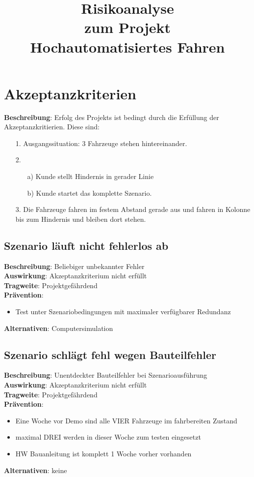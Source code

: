 \documentclass[a4paper, 12pt, titlepage]{scrartcl}
\begin{document}
\title{Risikoanalyse\\zum Projekt\\Hochautomatisiertes Fahren} 
\publishers{Humboldt-Universit\"at zu Berlin}
\maketitle
\tableofcontents
\newpage

\section{Akzeptanzkriterien}
\textbf{Beschreibung}: Erfolg des Projekts ist bedingt durch die Erfüllung der Akzeptanzkritierien. Diese sind:
		\begin{itemize}
			\item[1.] Ausgangssituation: 3 Fahrzeuge stehen hintereinander.
			\item[2.]
			\begin{itemize}
				\item[a)] Kunde stellt Hindernis in gerader Linie
				\item[b)] Kunde startet das komplette Szenario.
			\end{itemize}
			\item[3.] Die Fahrzeuge fahren im festem Abstand gerade aus und fahren in Kolonne bis zum Hindernis und bleiben dort stehen.
		\end{itemize}

	\subsection{Szenario läuft nicht fehlerlos ab}
		\textbf{Beschreibung}: Beliebiger unbekannter Fehler\\
		\textbf{Auswirkung}: Akzeptanzkriterium nicht erfüllt\\
		\textbf{Tragweite}: Projektgefährdend\\
		\textbf{Prävention}:
		\begin{itemize}
			\item Test unter Szenariobedingungen mit maximaler verfügbarer Redundanz
		\end{itemize}
		\textbf{Alternativen}: Computersimulation

	\subsection{Szenario schlägt fehl wegen Bauteilfehler}
	\textbf{Beschreibung}: Unentdeckter Bauteilfehler bei Szenarioausführung\\
	\textbf{Auswirkung}: Akzeptanzkriterium nicht erfüllt\\
	\textbf{Tragweite}: Projektgefährdend\\
	\textbf{Prävention}: 
	\begin{itemize}
		\item Eine Woche vor Demo sind alle VIER Fahrzeuge im fahrbereiten Zustand
		\item maximal DREI werden in dieser Woche zum testen eingesetzt
		\item HW Bauanleitung ist komplett 1 Woche vorher vorhanden
	\end{itemize}
	\textbf{Alternativen}: keine
\end{document}
